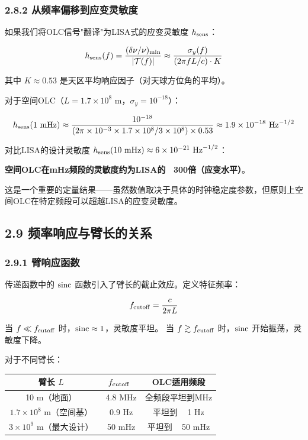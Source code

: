 \documentclass[12pt,a4paper]{article}
\begin{document}
\subsubsection{2.8.2 从频率偏移到应变灵敏度}


如果我们将OLC信号"翻译"为LISA式的应变灵敏度 $h_{\rm sens}$：

$$h_{\rm sens}(f) = \frac{(\delta\nu/\nu)_{\rm min}}{|\mathcal{T}(f)|} \approx \frac{\sigma_y(f)}{(2\pi f L/c) \cdot K}$$

其中 $K \approx 0.53$ 是天区平均响应因子（对天球方位角的平均）。

对于空间OLC（$L = 1.7 \times 10^8$ m，$\sigma_y = 10^{-18}$）：

$$h_{\rm sens}(1\ {\rm mHz}) \approx \frac{10^{-18}}{(2\pi \times 10^{-3} \times 1.7\times 10^8 / 3\times 10^8) \times 0.53} \approx 1.9 \times 10^{-18}\ {\rm Hz}^{-1/2}$$

对比LISA的设计灵敏度 $h_{\rm sens}(10\ {\rm mHz}) \approx 6 \times 10^{-21}\ {\rm Hz}^{-1/2}$：

\textbf{空间OLC在mHz频段的灵敏度约为LISA的 ~300倍（应变水平）}。

这是一个重要的定量结果——虽然数值取决于具体的时钟稳定度参数，但原则上空间OLC在特定频段可以超越LISA的应变灵敏度。

\subsection{2.9 频率响应与臂长的关系}


\subsubsection{2.9.1 臂响应函数}


传递函数中的 ${\rm sinc}$ 函数引入了臂长的截止效应。定义特征频率：

$$f_{\rm cutoff} = \frac{c}{2\pi L}$$

当 $f \ll f_{\rm cutoff}$ 时，${\rm sinc} \approx 1$，灵敏度平坦。
当 $f \gtrsim f_{\rm cutoff}$ 时，${\rm sinc}$ 开始振荡，灵敏度下降。

对于不同臂长：

\begin{tabular}{|c|c|c|}
\hline
臂长 $L$ & $f_{\rm cutoff}$ & OLC适用频段 \\
\hline
10 m（地面） & ~4.8 MHz & 全频段平坦到MHz \\
$1.7 \times 10^{8}$ m（空间基） & ~0.9 Hz & 平坦到 ~ 1 Hz \\
$3 \times 10^{9}$ m（最大设计） & ~50 mHz & 平坦到 ~ 50 mHz \\
\hline
\end{tabular}
\end{document}
